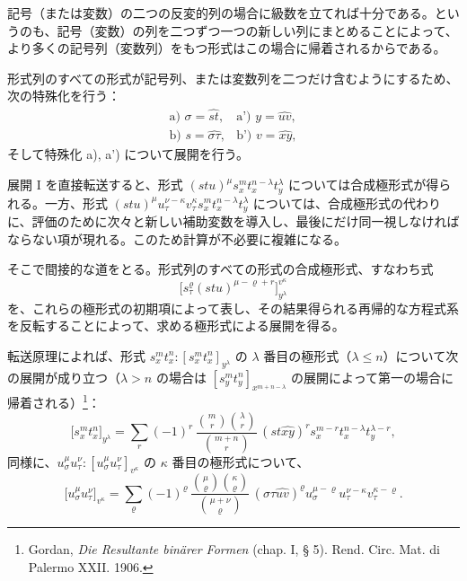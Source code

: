 \documentclass[11pt]{article}
\begin{document}
記号（または変数）の二つの反変的列の場合に級数を立てれば十分である。というのも、記号（変数）の列を二つずつ一つの新しい列にまとめることによって、より多くの記号列（変数列）をもつ形式はこの場合に帰着されるからである。

形式列のすべての形式が記号列、または変数列を二つだけ含むようにするため、次の特殊化を行う：
\[
\begin{array}{ll}
\text{a) } \sigma=\widehat{st}, & \text{a') } y=\widehat{uv},\\[0.3em]
\text{b) } s=\widehat{\sigma\tau}, & \text{b') } v=\widehat{xy},
\end{array}
\]
そして特殊化 a), a') について展開を行う。

展開 I を直接転送すると、形式 $(stu)^\mu s_x^m t_x^{n-\lambda}t_y^\lambda$ については合成極形式が得られる。一方、形式 $(stu)^\mu u_\tau^{\nu-\kappa}v_\tau^\kappa s_x^m t_x^{n-\lambda}t_y^\lambda$ については、合成極形式の代わりに、評価のために次々と新しい補助変数を導入し、最後にだけ同一視しなければならない項が現れる。このため計算が不必要に複雑になる。

そこで間接的な道をとる。形式列のすべての形式の合成極形式、すなわち式
\[
\bigl[s_\tau^\varrho(stu)^{\mu-\varrho+r}\bigr]_{y^\lambda}^{v^\kappa}
\]
を、これらの極形式の初期項によって表し、その結果得られる再帰的な方程式系を反転することによって、求める極形式による展開を得る。

転送原理によれば、形式 $s_x^m t_x^n:[s_x^m t_x^n]_{y^\lambda}$ の $\lambda$ 番目の極形式（$\lambda\le n$）について次の展開が成り立つ（$\lambda>n$ の場合は $[s_y^m t_y^n]_{x^{m+n-\lambda}}$ の展開によって第一の場合に帰着される）\footnote{Gordan, \emph{Die Resultante binärer Formen} (chap. I, § 5). Rend. Circ. Mat. di Palermo XXII. 1906.}：
\[
\bigl[s_x^m t_x^n\bigr]_{y^\lambda}
=\sum_r (-1)^r\,
\frac{\binom{m}{r}\binom{\lambda}{r}}{\binom{m+n}{r}}\,
(st\widehat{xy})^r s_x^{m-r}t_x^{n-\lambda}t_y^{\lambda-r},
\]
同様に、$u_\sigma^\mu u_\tau^\nu:[u_\sigma^\mu u_\tau^\nu]_{v^\kappa}$ の $\kappa$ 番目の極形式について、
\[
\bigl[u_\sigma^\mu u_\tau^\nu\bigr]_{v^\kappa}
=\sum_\varrho (-1)^\varrho\,
\frac{\binom{\mu}{\varrho}\binom{\kappa}{\varrho}}{\binom{\mu+\nu}{\varrho}}\,
(\sigma\tau\widehat{uv})^\varrho u_\sigma^{\mu-\varrho}u_\tau^{\nu-\kappa}v_\tau^{\kappa-\varrho}.
\]
\end{document}
